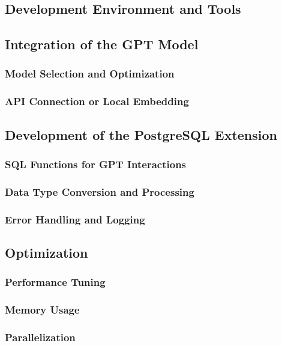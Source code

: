 \documentclass{article}
\begin{document}
\subsection{Development Environment and Tools}

\subsection{Integration of the GPT Model}
\subsubsection{Model Selection and Optimization}
\subsubsection{API Connection or Local Embedding}

\subsection{Development of the PostgreSQL Extension}
\subsubsection{SQL Functions for GPT Interactions}
\subsubsection{Data Type Conversion and Processing}
\subsubsection{Error Handling and Logging}

\subsection{Optimization}
\subsubsection{Performance Tuning}
\subsubsection{Memory Usage}
\subsubsection{Parallelization}

\newpage
\end{document}
